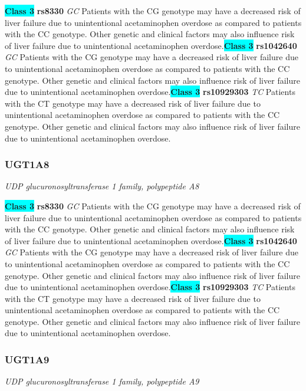 \documentclass{report}
\begin{document}
\textbf{\colorbox{cyan} {Class 3}} \textbf{ rs8330 } \textit{ GC }
Patients with the CG genotype may have a decreased risk of liver failure due to unintentional acetaminophen overdose as compared to patients with the CC genotype. Other genetic and clinical factors may also influence risk of liver failure due to unintentional acetaminophen overdose.\newline\textbf{\colorbox{cyan} {Class 3}} \textbf{ rs1042640 } \textit{ GC }
Patients with the CG genotype may have a decreased risk of liver failure due to unintentional acetaminophen overdose as compared to patients with the CC genotype. Other genetic and clinical factors may also influence risk of liver failure due to unintentional acetaminophen overdose.\newline\textbf{\colorbox{cyan} {Class 3}} \textbf{ rs10929303 } \textit{ TC }
Patients with the CT genotype may have a decreased risk of liver failure due to unintentional acetaminophen overdose as compared to patients with the CC genotype. Other genetic and clinical factors may also influence risk of liver failure due to unintentional acetaminophen overdose.\newline\subsubsection{ UGT1A8 }
\textit{ UDP glucuronosyltransferase 1 family, polypeptide A8 }

\textbf{\colorbox{cyan} {Class 3}} \textbf{ rs8330 } \textit{ GC }
Patients with the CG genotype may have a decreased risk of liver failure due to unintentional acetaminophen overdose as compared to patients with the CC genotype. Other genetic and clinical factors may also influence risk of liver failure due to unintentional acetaminophen overdose.\newline\textbf{\colorbox{cyan} {Class 3}} \textbf{ rs1042640 } \textit{ GC }
Patients with the CG genotype may have a decreased risk of liver failure due to unintentional acetaminophen overdose as compared to patients with the CC genotype. Other genetic and clinical factors may also influence risk of liver failure due to unintentional acetaminophen overdose.\newline\textbf{\colorbox{cyan} {Class 3}} \textbf{ rs10929303 } \textit{ TC }
Patients with the CT genotype may have a decreased risk of liver failure due to unintentional acetaminophen overdose as compared to patients with the CC genotype. Other genetic and clinical factors may also influence risk of liver failure due to unintentional acetaminophen overdose.\newline\subsubsection{ UGT1A9 }
\textit{ UDP glucuronosyltransferase 1 family, polypeptide A9 }
\end{document}
